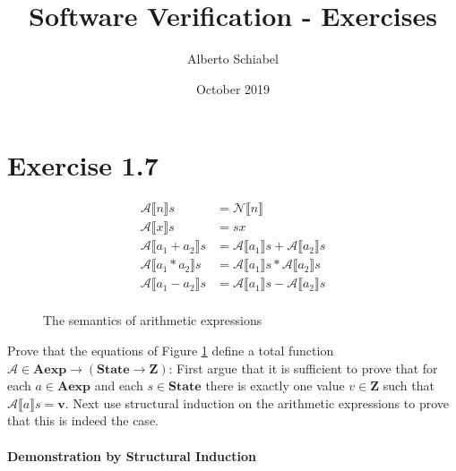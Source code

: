 \documentclass{article}
\title{Software Verification - Exercises}
\author{Alberto Schiabel}
\date{October 2019}
\begin{document}
\maketitle

\section{Exercise 1.7}

\begin{figure}[H]
    \begin{tcolorbox}[colframe=black, colback=white, sharp corners]

        \begin{equation}
        \begin{split}
        \mathcal{A}\llbracket n \rrbracket s &= \mathcal{N} \llbracket n \rrbracket \\
        \mathcal{A}\llbracket x \rrbracket s &= s x \\
        \mathcal{A}\llbracket a_1 + a_2 \rrbracket s &= \mathcal{A} \llbracket a_1 \rrbracket s + \mathcal{A} \llbracket a_2 \rrbracket s \\
        \mathcal{A}\llbracket a_1 * a_2 \rrbracket s &= \mathcal{A} \llbracket a_1 \rrbracket s * \mathcal{A} \llbracket a_2 \rrbracket s \\
        \mathcal{A}\llbracket a_1 - a_2 \rrbracket s &= \mathcal{A} \llbracket a_1 \rrbracket s - \mathcal{A} \llbracket a_2 \rrbracket s \\
        \end{split}
        \end{equation}

    \end{tcolorbox}
    \caption{The semantics of arithmetic expressions}
    \label{fig:aexp}
\end{figure}

Prove that the equations of Figure \ref{fig:aexp} define a total function $\mathcal{A} \in \textbf{Aexp} \rightarrow
(\textbf{State} \rightarrow \textbf{Z})$: First argue that it is sufficient to prove that for each $a \in \textbf{Aexp}$
and each $s \in \textbf{State}$ there is exactly one value $v \in \textbf{Z}$ such that $\mathcal{A}\llbracket a \rrbracket s = \textbf{v}$.
Next use structural induction on the arithmetic expressions to prove that this is indeed the case.

\paragraph{Demonstration by Structural Induction}\mbox{} \\
\end{document}
